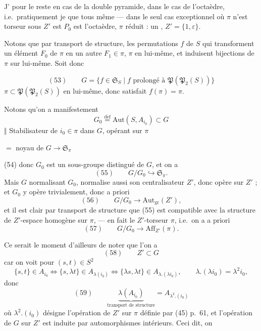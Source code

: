 \documentclass[11pt,a4paper]{article}
\begin{document}
J' \ill{} pour le reste en cas
de la double pyramide, \ill{} dans le cas
de l'octaèdre, i.e.\ pratiquement je 
que   \ill{} tous même  — dans
le seul cas exceptionnel où $\pi$ n'est
 torseur sous  $Z'$ est  \ill{}
\ill{} $P_0$ est l'octaèdre, $\pi$ réduit : un
\ill{}, $Z'=\{1,\varepsilon\}$.

Notons que par transport de structure,
les permutations $f$ de $S$ qui transforment
un élément $F_0$ de $\pi$ en un autre $F_1\in\pi$,
 
\ill{} $\pi$ en lui-même, et induisent
 bijections de $\pi$ sur lui-même. Soit donc

\[
(53)\qquad G=\{f\in\mathfrak{S}_S \mid f \text{ prolongé à } \mathfrak{P}(\mathfrak{P}_2(S))\}
\]
 $\pi\subset\mathfrak{P}(\mathfrak{P}_2(S))$ en lui-même, donc satisfait
$f(\pi)=\pi$.

 Notons qu'on a manifestement
\[
G_0 \overset{\mathrm{d\acute{e}f}}{=} \mathrm{Aut}(S,A_{i_0}) \subset G
\]
$\Vert$ \quad Stabilisateur de $i_0\in\pi$ dans $G$, opérant sur $\pi$

$=$ noyau de $G\to\mathfrak{S}_\pi$

(54) donc $G_0$ est un sous-groupe distingué de $G$, et on a
\[
(55)\qquad G/G_0 \hookrightarrow \mathfrak{S}_\pi .
\]
Mais $G$ normalisant $G_0$, normalise aussi son
centralisateur $Z'$, donc opère sur $Z'$ ;
et $G_0$ y opère trivialement, donc a priori
\[
(56)\qquad G/G_0 \longrightarrow \mathrm{Aut}_{\mathrm{gr}}(Z'),
\]
et il est clair par transport de structure
que (55) est compatible avec la structure
de $Z'$-espace homogène sur $\pi$, — en fait
le $Z'$-torseur $\pi$, \struck{\ill{}} i.e.\ on a a priori
\[
(57)\qquad G/G_0 \longrightarrow \mathrm{Aff}_{Z'}(\pi) .
\]

Ce serait le moment d'ailleurs de
noter que l'on a
\[
(58)\qquad Z' \subset G
\]
car on voit \struck{\ill{}} pour $(s,t)\in S^2$
\[
\{s,t\}\in A_{i_0} \Longleftrightarrow \{s,\lambda t\}\in A_{\lambda(i_0)}
\Longleftrightarrow \{\lambda s,\lambda t\}\in A_{\lambda.(\lambda i_0)},
\qquad \lambda.(\lambda i_0)=\lambda^2 i_0,
\]
donc
\[
(59)\qquad \underbrace{\lambda(A_{i_0})}_{\text{transport de structure}}
= A_{\lambda^2.(i_0)}
\]
où $\lambda^2.(i_0)$ désigne l'opération de $Z'$ sur $\pi$ définie par (45) p.~61,
et l'opération de $G$ sur $Z'$ est induite par
automorphismes intérieurs. Ceci dit, on 
\end{document}
